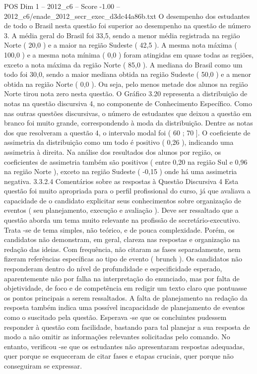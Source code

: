 \begin{textsample}{POS Dim 1 – 2012\_c6 – Score -1.00 – 2012\_c6/enade\_2012\_secr\_exec\_d3dc44a86b.txt}
O desempenho dos estudantes de todo o Brasil nesta questão foi superior ao desempenho na questão de número 3.
A média geral do Brasil foi 33,5, sendo a menor média registrada na região Norte ( 20,0 ) e a maior na região Sudeste ( 42,5 ).
A mesma nota máxima ( 100,0 ) e a mesma nota mínima ( 0,0 ) foram atingidas em quase todas as regiões, exceto a nota máxima da região Norte ( 85,0 ).
A mediana do Brasil como um todo foi 30,0, sendo a maior mediana obtida na região Sudeste ( 50,0 ) e a menor obtida na região Norte ( 0,0 ).
Ou seja, pelo menos metade dos alunos na região Norte tirou nota zero nesta questão.
O Gráfico 3.20 representa a distribuição de notas na questão discursiva 4, no componente de Conhecimento Específico.
Como nas outras questões discursivas, o número de estudantes que deixou a questão em branco foi muito grande, correspondendo à moda da distribuição.
Dentre as notas dos que resolveram a questão 4, o intervalo modal foi ( 60 ; 70 ].
O coeficiente de assimetria da distribuição como um todo é positivo ( 0,26 ), indicando uma assimetria à direita.
Na análise dos resultados dos alunos por região, os coeficientes de assimetria também são positivos ( entre 0,20 na região Sul e 0,96 na região Norte ), exceto na região Sudeste ( -0,15 ) onde há uma assimetria negativa. 3.3.2.4 Comentários sobre as respostas à Questão Discursiva 4 Esta questão foi muito apropriada para o perfil profissional do curso, já que avaliava a capacidade de o candidato explicitar seus conhecimentos sobre organização de eventos ( seu planejamento, execução e avaliação ).
Deve ser ressaltado que a questão aborda um tema muito relevante na profissão de secretário-executivo.
Trata -se de tema simples, não teórico, e de pouca complexidade.
Porém, os candidatos não demonstram, em geral, clareza nas respostas e organização na redação das ideias.
Com frequência, não citaram as fases separadamente, nem fizeram referências específicas ao tipo de evento ( brunch ).
Os candidatos não responderam dentro do nível de profundidade e especificidade esperado, aparentemente não por falha na interpretação do enunciado, mas por falta de objetividade, de foco e de competência em redigir um texto claro que pontuasse os pontos principais a serem ressaltados.
A falta de planejamento na redação da resposta também indica uma possível incapacidade de planejamento de eventos como o suscitado pela questão.
Esperava -se que os concluintes pudessem responder à questão com facilidade, bastando para tal planejar a sua resposta de modo a não omitir as informações relevantes solicitadas pelo comando.
No entanto, verificou -se que os estudantes não apresentaram respostas adequadas, quer porque se esqueceram de citar fases e etapas cruciais, quer porque não conseguiram se expressar.

\end{textsample}
